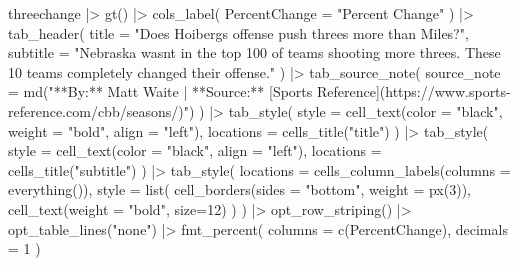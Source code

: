 \documentclass[
  letterpaper,
  DIV=11,
  numbers=noendperiod]{scrreprt}
\newenvironment{Shaded}{\begin{snugshade}}{\end{snugshade}}
\newcommand{\AttributeTok}[1]{\textcolor[rgb]{0.40,0.45,0.13}{#1}}
\newcommand{\DecValTok}[1]{\textcolor[rgb]{0.68,0.00,0.00}{#1}}
\newcommand{\FunctionTok}[1]{\textcolor[rgb]{0.28,0.35,0.67}{#1}}
\newcommand{\NormalTok}[1]{\textcolor[rgb]{0.00,0.23,0.31}{#1}}
\newcommand{\SpecialCharTok}[1]{\textcolor[rgb]{0.37,0.37,0.37}{#1}}
\newcommand{\StringTok}[1]{\textcolor[rgb]{0.13,0.47,0.30}{#1}}
\begin{document}
\begin{Shaded}
\begin{Highlighting}[]
\NormalTok{threechange }\SpecialCharTok{|\textgreater{}} 
  \FunctionTok{gt}\NormalTok{() }\SpecialCharTok{|\textgreater{}} 
  \FunctionTok{cols\_label}\NormalTok{(}
    \AttributeTok{PercentChange =} \StringTok{"Percent Change"}
\NormalTok{  ) }\SpecialCharTok{|\textgreater{}}
  \FunctionTok{tab\_header}\NormalTok{(}
    \AttributeTok{title =} \StringTok{"Does Hoiberg\textquotesingle{}s offense push threes more than Miles?"}\NormalTok{,}
    \AttributeTok{subtitle =} \StringTok{"Nebraska wasn\textquotesingle{}t in the top 100 of teams shooting more threes. These 10 teams completely changed their offense."}
\NormalTok{  ) }\SpecialCharTok{|\textgreater{}}  
  \FunctionTok{tab\_source\_note}\NormalTok{(}
    \AttributeTok{source\_note =} \FunctionTok{md}\NormalTok{(}\StringTok{"**By:** Matt Waite  |  **Source:** [Sports Reference](https://www.sports{-}reference.com/cbb/seasons/)"}\NormalTok{)}
\NormalTok{  ) }\SpecialCharTok{|\textgreater{}} 
  \FunctionTok{tab\_style}\NormalTok{(}
    \AttributeTok{style =} \FunctionTok{cell\_text}\NormalTok{(}\AttributeTok{color =} \StringTok{"black"}\NormalTok{, }\AttributeTok{weight =} \StringTok{"bold"}\NormalTok{, }\AttributeTok{align =} \StringTok{"left"}\NormalTok{),}
    \AttributeTok{locations =} \FunctionTok{cells\_title}\NormalTok{(}\StringTok{"title"}\NormalTok{)}
\NormalTok{  ) }\SpecialCharTok{|\textgreater{}} 
  \FunctionTok{tab\_style}\NormalTok{(}
    \AttributeTok{style =} \FunctionTok{cell\_text}\NormalTok{(}\AttributeTok{color =} \StringTok{"black"}\NormalTok{, }\AttributeTok{align =} \StringTok{"left"}\NormalTok{),}
    \AttributeTok{locations =} \FunctionTok{cells\_title}\NormalTok{(}\StringTok{"subtitle"}\NormalTok{)}
\NormalTok{  ) }\SpecialCharTok{|\textgreater{}}
  \FunctionTok{tab\_style}\NormalTok{(}
     \AttributeTok{locations =} \FunctionTok{cells\_column\_labels}\NormalTok{(}\AttributeTok{columns =} \FunctionTok{everything}\NormalTok{()),}
     \AttributeTok{style =} \FunctionTok{list}\NormalTok{(}
       \FunctionTok{cell\_borders}\NormalTok{(}\AttributeTok{sides =} \StringTok{"bottom"}\NormalTok{, }\AttributeTok{weight =} \FunctionTok{px}\NormalTok{(}\DecValTok{3}\NormalTok{)),}
       \FunctionTok{cell\_text}\NormalTok{(}\AttributeTok{weight =} \StringTok{"bold"}\NormalTok{, }\AttributeTok{size=}\DecValTok{12}\NormalTok{)}
\NormalTok{     )}
\NormalTok{   ) }\SpecialCharTok{|\textgreater{}}
  \FunctionTok{opt\_row\_striping}\NormalTok{() }\SpecialCharTok{|\textgreater{}} 
  \FunctionTok{opt\_table\_lines}\NormalTok{(}\StringTok{"none"}\NormalTok{) }\SpecialCharTok{|\textgreater{}}
    \FunctionTok{fmt\_percent}\NormalTok{(}
    \AttributeTok{columns =} \FunctionTok{c}\NormalTok{(PercentChange),}
    \AttributeTok{decimals =} \DecValTok{1}
\NormalTok{  )}
\end{Highlighting}
\end{Shaded}
\end{document}
